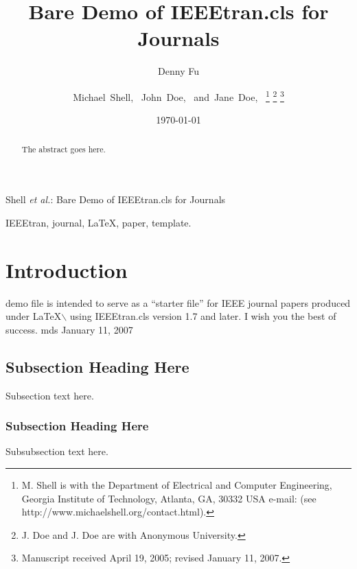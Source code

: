 \documentclass[journal]{IEEEtran}
\author{Denny Fu}
\date{\today}
\title{}
\begin{document}
\title{Bare Demo of IEEEtran.cls for Journals}

\author{Michael~Shell,~
John~Doe,~
and~Jane~Doe,~%
\thanks{M. Shell is with the Department
of Electrical and Computer Engineering, Georgia Institute of Technology, Atlanta, GA, 30332 USA e-mail: (see http://www.michaelshell.org/contact.html).}%
\thanks{J. Doe and J. Doe are with Anonymous University.}%
\thanks{Manuscript received April 19, 2005; revised January 11, 2007.}}


%
{Shell \MakeLowercase{\textit{et al.}}: Bare Demo of IEEEtran.cls for Journals}



\maketitle

\begin{abstract}
The abstract goes here.
\end{abstract}


\begin{IEEEkeywords}
IEEEtran, journal, \LaTeX, paper, template.
\end{IEEEkeywords}

\IEEEpeerreviewmaketitle

\section{Introduction}
\label{sec:orgheadline3}
demo file is intended to serve as a ``starter file''
for IEEE journal papers produced under \LaTeX$\backslash$ using
IEEEtran.cls version 1.7 and later.
I wish you the best of success.
\hfill
mds
\hfill
January 11, 2007

\subsection{Subsection Heading Here}
\label{sec:orgheadline2}
Subsection text here.

\subsubsection{Subsection Heading Here}
\label{sec:orgheadline1}
Subsubsection text here.
\end{document}
